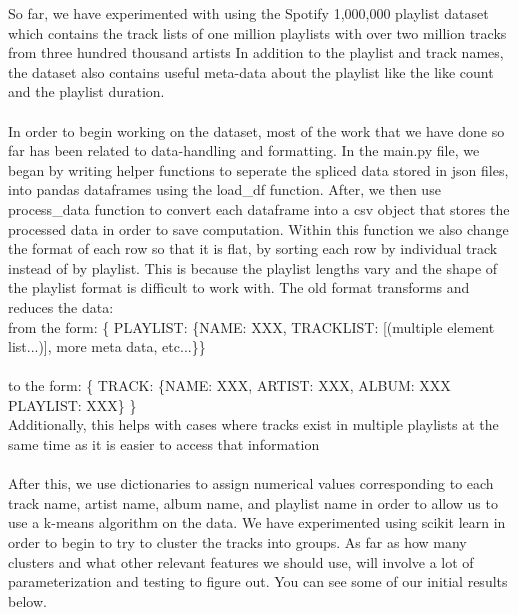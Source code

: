 \documentclass{article}
\begin{document}
So far, we have experimented with using the Spotify 1,000,000 playlist dataset which contains the track lists of one million playlists with over two million tracks from three hundred thousand artists
In addition to the playlist and track names, the dataset also contains useful meta-data about the playlist like the like count and the playlist duration. \\ \\

In order to begin working on the dataset, most of the work that we have done so far has been related to data-handling and formatting. In the main.py file, we began by writing helper functions to seperate the
spliced data stored in json files, into pandas dataframes using the load\_df function. After, we then use process\_data function to convert each dataframe into a csv object that stores the processed data in order
to save computation. Within this function we also change the format of each row so that it is flat, by sorting each row by individual track instead of by playlist. This is because the playlist lengths vary and
the shape of the playlist format is difficult to work with. The old format transforms and reduces the data: \\
from the form: \{ PLAYLIST: \{NAME: XXX, TRACKLIST: [(multiple element list...)], more meta data, etc...\}\} \\ \\to the form: \{ TRACK: \{NAME: XXX, ARTIST: XXX, ALBUM: XXX PLAYLIST: XXX\} \} \\
Additionally, this helps with cases where tracks exist in multiple playlists at the same time as it is easier to access that information \\ \\

After this, we use dictionaries to assign numerical values corresponding to each track name, artist name, album name, and playlist name in order to allow us to use a k-means algorithm on the data. We have experimented
using scikit learn in order to begin to try to cluster the tracks into groups. As far as how many clusters and what other relevant features we should use, will involve a lot of parameterization and testing to figure out.
You can see some of our initial results below. \\ \\
\end{document}
